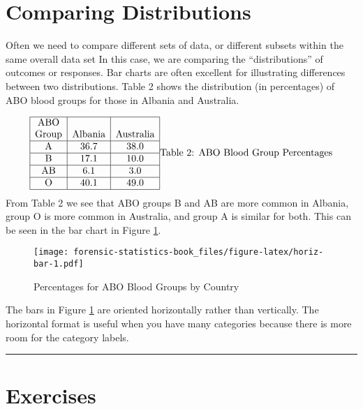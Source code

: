 \documentclass[
]{book}
\begin{document}
\hypertarget{comparing-distributions}{%
\section{Comparing Distributions}\label{comparing-distributions}}

Often we need to compare different sets of data, or different subsets
within the same overall data set In this case, we are comparing the
``distributions'' of outcomes or responses. Bar charts are
often excellent for illustrating differences between two distributions. Table
2 shows the distribution (in percentages) of ABO blood groups for those in
Albania and Australia.

\[
\begin{array}{|c|c|c|} \hline
\text{ABO} && \\
\text{Group} & \text{Albania} & \text{Australia} \\ \hline
\mathrm{A} & 36.7 & 38.0 \\  \hline
\mathrm{B} & 17.1 & 10.0 \\  \hline
\mathrm{AB} & 6.1 & 3.0 \\  \hline
\mathrm{O} & 40.1 & 49.0 \\  \hline
\end{array}\\
\mbox{Table 2: ABO Blood Group Percentages}
\]
From Table 2 we see that ABO groups B and AB are more common in Albania,
group O is more common in Australia, and group A is similar for both.
This can be seen in the bar chart in Figure \ref{fig:horiz-bar}.

\begin{figure}
\centering
\texttt{[image: forensic-statistics-book\_files/figure-latex/horiz-bar-1.pdf]}
\caption{\label{fig:horiz-bar}Percentages for ABO Blood Groups by Country}
\end{figure}

The bars in Figure \ref{fig:horiz-bar} are oriented horizontally rather than vertically. The
horizontal format is useful when you have many categories because there is more
room for the category labels.

\begin{center}\rule{0.5\linewidth}{0.5pt}\end{center}

\hypertarget{exercises-2}{%
\section{Exercises}\label{exercises-2}}
\end{document}
